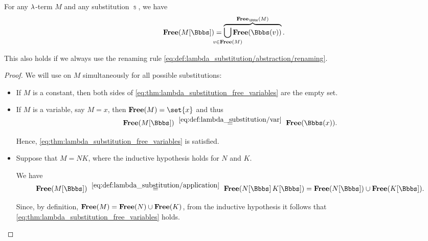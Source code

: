 \begin{proposition}\label{thm:lambda_substitution_free_variables}
  For any \( \mathrm{\lambda} \)-term \( M \) and any substitution \( \Bbbs \), we have
  \begin{equation}\label{eq:thm:lambda_substitution_free_variables}
    \op*{Free}( M[\Bbbs] ) = \overbrace{\bigcup_{\mathclap{v \in \op*{Free}(M)}} \op*{Free}(\Bbbs(v))}^{\op*{Free}_\Bbbs(M)}.
  \end{equation}

  This also holds if we always use the renaming rule \eqref{eq:def:lambda_substitution/abstraction/renaming}.
\end{proposition}
\begin{proof}
  We will use  on \( M \) simultaneously for all possible substitutions:
  \begin{itemize}
    \item If \( M \) is a constant, then both sides of \eqref{eq:thm:lambda_substitution_free_variables} are the empty set.

    \item If \( M \) is a variable, say \( M = x \), then \( \op*{Free}(M) = \set{ x } \) and thus
    \begin{equation*}
      \op*{Free}(M[\Bbbs])
      \reloset {\eqref{eq:def:lambda_substitution/var}} =
      \op*{Free}(\Bbbs(x)).
    \end{equation*}

    Hence, \eqref{eq:thm:lambda_substitution_free_variables} is satisfied.

    \item Suppose that \( M = NK \), where the inductive hypothesis holds for \( N \) and \( K \).

    We have
    \begin{equation*}
      \op*{Free}(M[\Bbbs])
      \reloset {\eqref{eq:def:lambda_substitution/application}} =
      \op*{Free}(N[\Bbbs] \thinspace K[\Bbbs])
      =
      \op*{Free}(N[\Bbbs]) \cup \op*{Free}(K[\Bbbs]).
    \end{equation*}

    Since, by definition, \( \op*{Free}(M) = \op*{Free}(N) \cup \op*{Free}(K) \), from the inductive hypothesis it follows that \eqref{eq:thm:lambda_substitution_free_variables} holds.


\end{itemize}
\end{proof}
